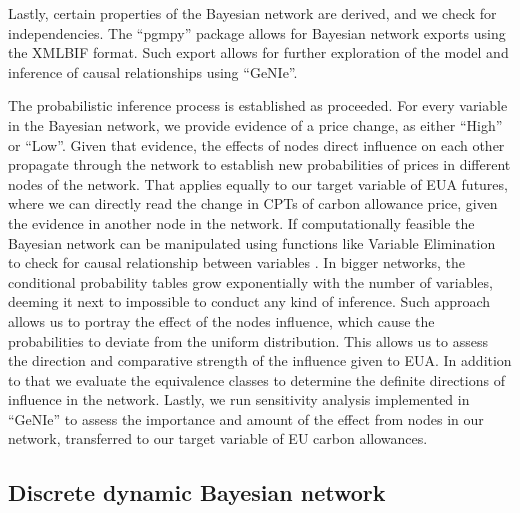 \documentclass[12pt, letterpaper]{article}
\begin{document}
Lastly, certain properties of the Bayesian network are derived, and we check for independencies. The “pgmpy” package allows for Bayesian network exports using the XMLBIF format. Such export allows for further exploration of the model and inference of causal relationships using “GeNIe”.

The probabilistic inference process is established as proceeded. For every variable in the Bayesian network, we provide evidence of a price change, as either “High” or “Low”. Given that evidence, the effects of nodes direct influence on each other propagate through the network to establish new probabilities of prices in different nodes of the network. That applies equally to our target variable of EUA futures, where we can directly read the change in CPTs of carbon allowance price, given the evidence in another node in the network. If computationally feasible the Bayesian network can be manipulated using functions like Variable Elimination to check for causal relationship between variables \parencite{bengal2008}. In bigger networks, the conditional probability tables grow exponentially with the number of variables, deeming it next to impossible to conduct any kind of inference. Such approach allows us to portray the effect of the nodes influence, which cause the probabilities to deviate from the uniform distribution. This allows us to assess the direction and comparative strength of the influence given to EUA. In addition to that we evaluate the equivalence classes to determine the definite directions of influence in the network. Lastly, we run sensitivity analysis implemented in “GeNIe” to assess the importance and amount of the effect from nodes in our network, transferred to our target variable of EU carbon allowances.

\subsection{Discrete dynamic Bayesian network}
\end{document}
